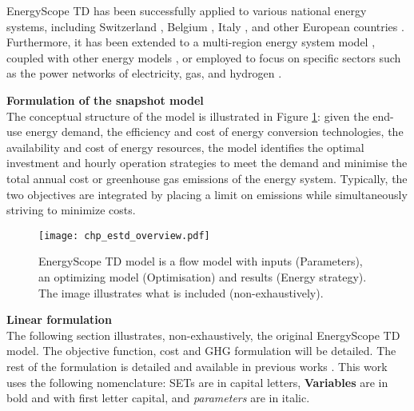 EnergyScope TD has been successfully applied to various national energy systems, including Switzerland \cite{Limpens_role_2019,limpens2019energyscope}, Belgium \cite{Limpens2020}, Italy \cite{borasio2022deep}, and other European countries \cite{dommisse2020modelling}. Furthermore, it has been extended to a multi-region energy system model \cite{thiran2023validation}, coupled with other energy models \cite{pavivcevic2022bidirectionnal}, or employed to focus on specific sectors such as the power networks of electricity, gas, and hydrogen \cite{schnidrig2023role}.

\vspace{0.2cm}\textbf{Formulation of the snapshot model}\vspace{-0.3cm}\\

The conceptual structure of the model is illustrated in Figure \ref{fig:estd_overview}: given the end-use energy demand, the efficiency and cost of energy conversion technologies, the availability and cost of energy resources, the model identifies the optimal investment and hourly operation strategies to meet the demand and minimise the total annual cost or greenhouse gas emissions of the energy system. Typically, the two objectives are integrated by placing a limit on emissions while simultaneously striving to minimize costs. 

 \begin{figure}[!htbp]
\centering
\texttt{[image: chp\_estd\_overview.pdf]}
\caption{EnergyScope TD model is a flow model with inputs (Parameters), an optimizing model (Optimisation) and results (Energy strategy). The image illustrates what is included (non-exhaustively).}
\label{fig:estd_overview}
\end{figure}

\vspace{0.2cm}\textbf{Linear formulation}\vspace{-0.3cm}\\

The following section illustrates, non-exhaustively, the original EnergyScope TD model. The objective function, cost and \gls{GHG} formulation will be detailed. The rest of the formulation is detailed and available in previous works \cite{limpens2021generating}. 
This work uses the following nomenclature: SETs are in capital letters, \textbf{Variables} are in bold and with first letter capital, and \emph{parameters} are in italic. 

